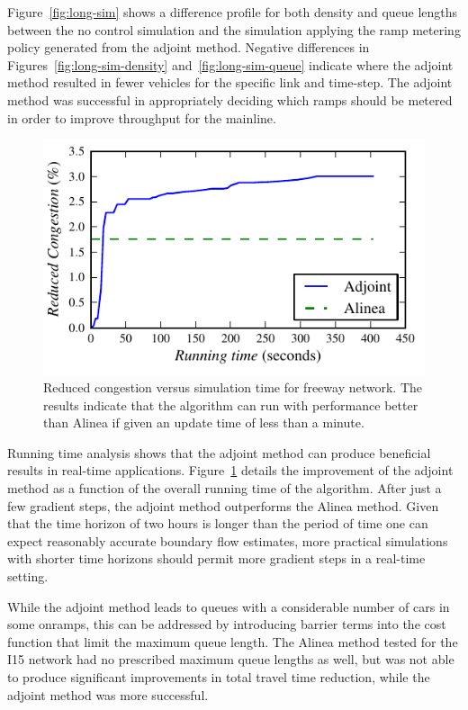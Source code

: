 														
							Figure~\ref{fig:long-sim} shows a difference profile for both density and queue lengths between the
							no control simulation and the simulation applying the ramp metering
							policy generated from the adjoint method. Negative differences in
							Figures~\ref{fig:long-sim-density} and~\ref{fig:long-sim-queue}
							indicate where the adjoint method resulted in fewer vehicles for the
							specific link and time-step. The adjoint method was successful in
							appropriately deciding which ramps should be metered in order to improve
							throughput for the mainline.
							\begin{figure}
								\begin{centering}
									\includegraphics[width=0.65\columnwidth]{images/longsim}
									\par\end{centering}
									\caption{Reduced congestion versus simulation time for freeway network. The results
										indicate that the algorithm can run with performance better than Alinea
										if given an update time of less than a minute.}\label{fig:running-time}
								\end{figure}
																
																
								Running time analysis shows that the adjoint method can produce beneficial
								results in real-time applications. Figure~\ref{fig:running-time} details the improvement of the adjoint method as a function of the overall running time of the algorithm. After just a few gradient steps, the
								adjoint method outperforms the Alinea method. Given that the time
								horizon of two hours is longer than the period of time one can expect
								reasonably accurate boundary flow estimates, more practical simulations
								with shorter time horizons should permit more gradient steps in a
								real-time setting.
																
								While the adjoint method leads to queues with a considerable number of cars in some onramps, this can be addressed by introducing barrier terms into the cost function that limit the
								maximum queue length. The Alinea method tested for the I15 network
								had no prescribed maximum queue lengths as well, but was not able
								to produce significant improvements in total travel time reduction, while the adjoint method was
								more successful.
																
